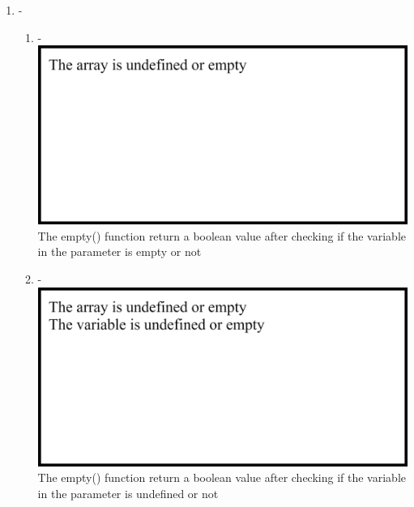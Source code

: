 \documentclass[12pt,titlepage]{article}
\begin{document}
\begin{enumerate}
    \item -
    \begin{enumerate}
        \item - \\ \includegraphics[width=.85\textwidth]{images/figures/fig2.1.png} \\ The empty() function return a boolean value after checking if the variable in the parameter is empty or not
        \item - \\ \includegraphics[width=.85\textwidth]{images/figures/fig2.2.png} \\ The empty() function return a boolean value after checking if the variable in the parameter is undefined or not
    \end{enumerate}

    \newpage


\end{enumerate}
\end{document}
